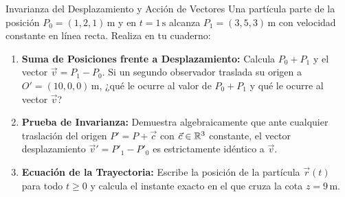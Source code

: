 \documentclass[10pt,aspectratio=169]{beamer}
\begin{document}
\begin{frame}{Invarianza del Desplazamiento y Acción de Vectores}
  \vspace{0.05cm}
  Una partícula parte de la posición $P_0 = (1, 2, 1)\,\text{m}$ y en $t = 1\,\text{s}$ alcanza $P_1 = (3, 5, 3)\,\text{m}$ con velocidad constante en línea recta. Realiza en tu cuaderno:
  \vspace{0.25cm}
  \begin{enumerate}\itemsep10pt
    \item[(a)] \textbf{Suma de Posiciones frente a Desplazamiento:} Calcula $P_0 + P_1$ y el vector $\vec{v} = P_1 - P_0$. Si un segundo observador traslada su origen a $O' = (10, 0, 0)\,\text{m}$, ¿qué le ocurre al valor de $P_0 + P_1$ y qué le ocurre al vector $\vec{v}$?
    \item[(b)] \textbf{Prueba de Invarianza:} Demuestra algebraicamente que ante cualquier traslación del origen $P' = P + \vec{c}$ con $\vec{c} \in \mathbb{R}^3$ constante, el vector desplazamiento $\vec{v}' = P'_1 - P'_0$ es estrictamente idéntico a $\vec{v}$.
    \item[(c)] \textbf{Ecuación de la Trayectoria:} Escribe la posición de la partícula $\vec{r}(t)$ para todo $t \ge 0$ y calcula el instante exacto en el que cruza la cota $z = 9\,\text{m}$.
  \end{enumerate}
\end{frame}
\end{document}
